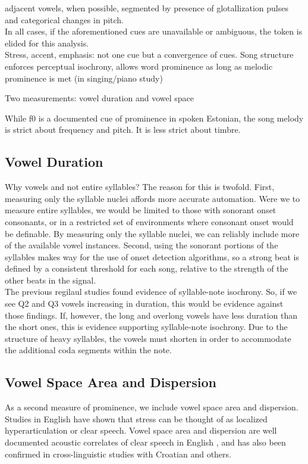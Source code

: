 adjacent vowels, when possible, segmented by presence of glotallization pulses and categorical changes in pitch. \\

In all cases, if the aforementioned cues are unavailable or ambiguous, the token is elided for this analysis. \\

Stress, accent, emphasis: not one cue but a convergence of cues. 
Song structure enforces perceptual isochrony, allows word prominence as long as melodic prominence is met (in singing/piano study) 

Two measurements: vowel duration and vowel space

While f0 is a documented cue of prominence in spoken Estonian, the song melody is strict about frequency and pitch. It is less strict about timbre. 
\subsection{Vowel Duration}
Why vowels and not entire syllables? The reason for this is twofold. First, measuring only the syllable nuclei affords more accurate automation. Were we to measure entire syllables, we would be limited to those with sonorant onset consonants, or in a restricted set of environments where consonant onset would be definable. By measuring only the syllable nuclei, we can reliably include more of the available vowel instances. Second, using the sonorant portions of the syllables makes way for the use of onset detection algorithms, so a strong beat is defined by a consistent threshold for each song, relative to the strength of the other beats in the signal. \\
The previous regilaul studies found evidence of syllable-note isochrony. So, if we see Q2 and Q3 vowels increasing in duration, this would be evidence against those findings. If, however, the long and overlong vowels have less duration than the short ones, this is evidence supporting syllable-note isochrony. Due to the structure of heavy syllables, the vowels must shorten in order to accommodate the additional coda segments within the note. 


\subsection{Vowel Space Area and Dispersion}

As a second measure of prominence, we include vowel space area and dispersion. Studies in English have shown that stress can be thought of as localized hyperarticulation or clear speech. \cite{deJong} Vowel space area and dispersion are well documented acoustic correlates of clear speech in English \cite{bradlow}, and has also been confirmed in cross-linguistic studies with Croatian \cite{rajka} and others. \\


